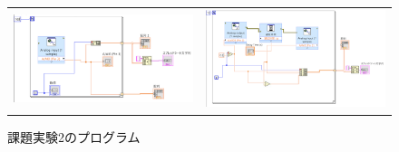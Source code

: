 \documentclass[11pt,dvipdfmx]{jarticle}
\begin{document}
			\begin{figure}[b]
				\begin{tabular}{cc}
					\begin{minipage}[c]{0.5\linewidth}
						\centering
						\includegraphics[keepaspectratio,scale=0.45]{circuit1.png}
						\caption{課題実験１のプログラム}
						\label{fig:program1}
		
					\end{minipage}&
		
					\begin{minipage}[c]{0.5\linewidth}
						\centering
						\includegraphics[keepaspectratio,scale=0.4]{circuit2.png}
						\caption{課題実験2のプログラム}
						\label{fig:program2}
						
					\end{minipage}\\


\end{tabular}
\end{figure}
\end{document}
